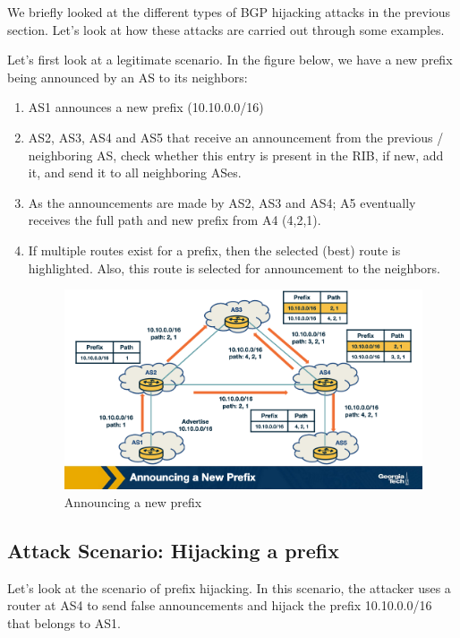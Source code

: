 \documentclass[11pt]{article}
\begin{document}
We briefly looked at the different types of BGP hijacking attacks in the previous section. Let's look at how these attacks are carried out through some examples. 

Let's first look at a legitimate scenario. In the figure below, we have a new prefix being announced by an AS to its neighbors:

\begin{enumerate}
\item AS1 announces a new prefix (10.10.0.0/16)
\item AS2, AS3, AS4 and AS5 that receive an announcement from the previous / neighboring AS, check whether this entry is present in the RIB, if new, add it, and send it to all neighboring ASes.
\item As the announcements are made by AS2, AS3 and AS4; A5 eventually receives the full path and new prefix from A4 (4,2,1).
\item If multiple routes exist for a prefix, then the selected (best) route is highlighted. Also, this route is selected for announcement to the neighbors.

\begin{figure}[htbp]
\centering
\includegraphics[width=.9\linewidth]{./MD_Figures/9_bgp_attacks_1.png}
\caption{\label{fig:org3878b32}Announcing a new prefix}
\end{figure}
\end{enumerate}

\subsection{Attack Scenario: Hijacking a prefix}
\label{sec:orgafae2b5}

Let's look at the scenario of prefix hijacking. In this scenario, the attacker uses a router at AS4 to send false announcements and hijack the prefix 10.10.0.0/16 that belongs to AS1.  
\end{document}
